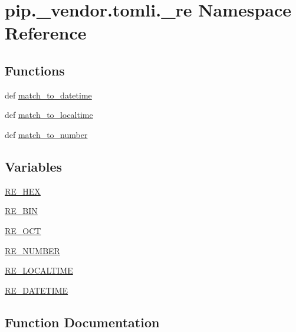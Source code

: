 \hypertarget{namespacepip_1_1__vendor_1_1tomli_1_1__re}{}\section{pip.\+\_\+vendor.\+tomli.\+\_\+re Namespace Reference}
\label{namespacepip_1_1__vendor_1_1tomli_1_1__re}
\subsection*{Functions}
\begin{DoxyCompactItemize}
\item 
def \hyperlink{namespacepip_1_1__vendor_1_1tomli_1_1__re_a8040815d8bbab873a1f2a488eb80a543}{match\+\_\+to\+\_\+datetime}
\item 
def \hyperlink{namespacepip_1_1__vendor_1_1tomli_1_1__re_a837b6c0ef67030405bedbb84d822f2f0}{match\+\_\+to\+\_\+localtime}
\item 
def \hyperlink{namespacepip_1_1__vendor_1_1tomli_1_1__re_ac9e86a1067d199fd6d05329531778e2a}{match\+\_\+to\+\_\+number}
\end{DoxyCompactItemize}
\subsection*{Variables}
\begin{DoxyCompactItemize}
\item 
\hyperlink{namespacepip_1_1__vendor_1_1tomli_1_1__re_a9a6b1c5e50d94f5d2b480ca4f73732bf}{R\+E\+\_\+\+H\+EX}
\item 
\hyperlink{namespacepip_1_1__vendor_1_1tomli_1_1__re_aa244a93b46997893e3b2b1f42880758c}{R\+E\+\_\+\+B\+IN}
\item 
\hyperlink{namespacepip_1_1__vendor_1_1tomli_1_1__re_aeea43a12e89460c6b94f76c4ad0d3f78}{R\+E\+\_\+\+O\+CT}
\item 
\hyperlink{namespacepip_1_1__vendor_1_1tomli_1_1__re_ad2300d5479fa770e3c3fc42994ef5a85}{R\+E\+\_\+\+N\+U\+M\+B\+ER}
\item 
\hyperlink{namespacepip_1_1__vendor_1_1tomli_1_1__re_a5cec53937b4358aaba324df37d60af1c}{R\+E\+\_\+\+L\+O\+C\+A\+L\+T\+I\+ME}
\item 
\hyperlink{namespacepip_1_1__vendor_1_1tomli_1_1__re_ac8e7642b265968ab49d4980633d7798b}{R\+E\+\_\+\+D\+A\+T\+E\+T\+I\+ME}
\end{DoxyCompactItemize}


\subsection{Function Documentation}
\mbox{\label{namespacepip_1_1__vendor_1_1tomli_1_1__re_a8040815d8bbab873a1f2a488eb80a543}} 
